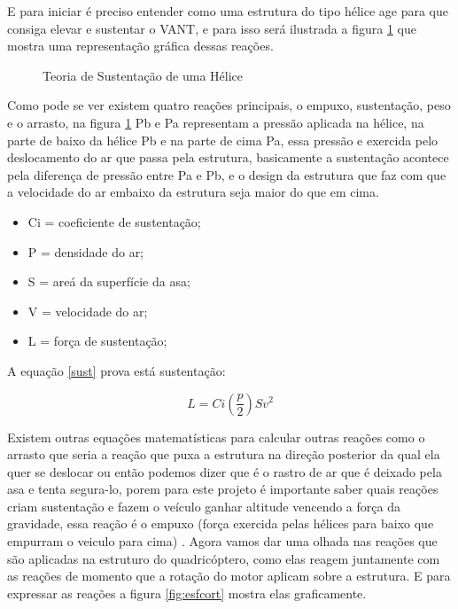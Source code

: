 E para iniciar é preciso entender como uma estrutura do tipo hélice age para que consiga elevar e sustentar o VANT, e para isso será ilustrada a figura \ref{fig:asa} que mostra uma representação gráfica dessas reações. 

\begin{figure}[H]
	\centering
	\caption{Teoria de Sustentação de uma Hélice}
	\fontsize{9pt}{12pt}\selectfont
	\def\svgwidth{13cm}
	
	\label{fig:asa}
\end{figure}

Como pode se ver existem quatro reações principais, o empuxo, sustentação, peso e o arrasto, na figura \ref{fig:asa} Pb e Pa representam a pressão aplicada na hélice, na  parte de baixo da hélice Pb e na parte de cima Pa, essa pressão e exercida pelo deslocamento do ar que passa pela estrutura, basicamente a sustentação acontece pela diferença de pressão entre Pa e Pb, e o design da estrutura que faz com que a velocidade do ar embaixo da estrutura seja maior do que em cima.

\begin{itemize}
    \item Ci = coeficiente de sustentação;
    \item P = densidade do ar; 
    \item S = areá da superfície da asa;
    \item V = velocidade do ar; 
    \item L = força de sustentação;
\end{itemize}{}
A equação \ref{sust} prova está sustentação: 

\begin{equation}
    \label{sust}
    L=Ci\left(\frac{p}{2}\right)Sv^2
\end{equation}

Existem outras equações matematísticas para calcular outras reações como o arrasto que seria a reação que puxa a estrutura na direção posterior da qual ela quer se deslocar ou então podemos dizer que é o rastro de ar que é deixado pela asa e tenta segura-lo, porem para este projeto é importante saber quais reações criam sustentação e fazem o veículo ganhar altitude vencendo a força da gravidade, essa reação é o empuxo (força exercida pelas hélices para baixo que empurram o veiculo para cima) \cite{inproceedings}.
Agora vamos dar uma olhada nas reações que são aplicadas na estruturo do quadricóptero, como elas reagem juntamente com as reações de momento que a rotação do motor aplicam sobre a estrutura. E para expressar as reações a figura \ref{fig:esfcort} mostra elas graficamente. 

